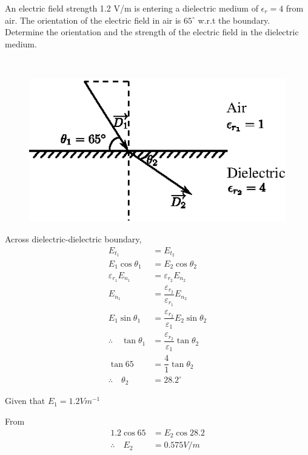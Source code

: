 \begin{problem}
An electric field strength 1.2 V/m is entering a dielectric medium of $\epsilon_{r} = 4$ from air. The orientation of the electric field in air is $65^{\circ}$ w.r.t the boundary. Determine the orientation and the strength of the electric field in the dielectric medium. 
\end{problem}

\begin{solution}
~

\begin{figure}[H]
\centering
\includegraphics[scale=1.1]{images/fig5.eps}\label{chap27-fig5}
\end{figure}

Across dielectric-dielectric boundary, 
\begin{align*}
E_{t_{1}} & = E_{t_{2}}\\
E_{1} \cos \theta_{1} & = E_{2} \cos \theta_{2}\\
\varepsilon_{r_{1}}E_{n_{1}} & = \varepsilon_{r_{2}}E_{n_{2}}\\
E_{n_{1}} & = \dfrac{\varepsilon_{r_{2}}}{\varepsilon_{r_{1}}} E_{n_{2}}\\
E_{1} \sin \theta_{1} & = \dfrac{\varepsilon_{r_{2}}}{\varepsilon_{1}} E_{2} \sin \theta_{2}\\
\therefore\quad \tan \theta_{1} & = \dfrac{\varepsilon_{r_{2}}}{\varepsilon_{1}} \tan \theta_{2}\\
\tan 65 & = \dfrac{4}{1} \tan \theta_{2}\\
\therefore\quad \theta_{2} & = 28.2^{\circ}
\end{align*}

Given that $E_{1} = 1.2 Vm^{-1}$

From 
\begin{align*}
1.2\cos 65 & = E_{2} \cos 28.2\\
\therefore\quad E_{2} & = 0.575 V/m
\end{align*}
\end{solution}

